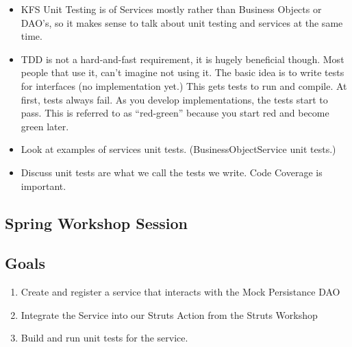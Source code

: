 \begin{ifhtml}
\begin{s5slide}
    \begin{s5notes}
      \begin{itemize}
      \item KFS Unit Testing is of Services mostly rather than Business Objects or DAO's, so it makes sense to talk about unit 
        testing and services at the same time.
      \item TDD is not a hard-and-fast requirement, it is hugely beneficial though. Most people that use it, can't imagine not 
        using it. The basic idea is to write tests for interfaces (no implementation yet.) This gets tests to run and compile. 
        At first, tests always fail. As you develop implementations, the tests start to pass. This is referred to as ``red-green'' 
        because you start red and become green later.
      \item Look at examples of services unit tests. (BusinessObjectService unit tests.)
      \item Discuss unit tests are what we call the tests we write. Code Coverage is important. 
      \end{itemize}
    \end{s5notes} 
  \end{s5slide}

  \begin{s5slide}
    \section{Spring Workshop Session}
    \subsection{Goals}
    \begin{enumerate}
      \item Create and register a service that interacts with the Mock Persistance DAO
      \item Integrate the Service into our Struts Action from the Struts Workshop
      \item Build and run unit tests for the service.
    \end{enumerate}

  \end{s5slide}
\end{ifhtml}